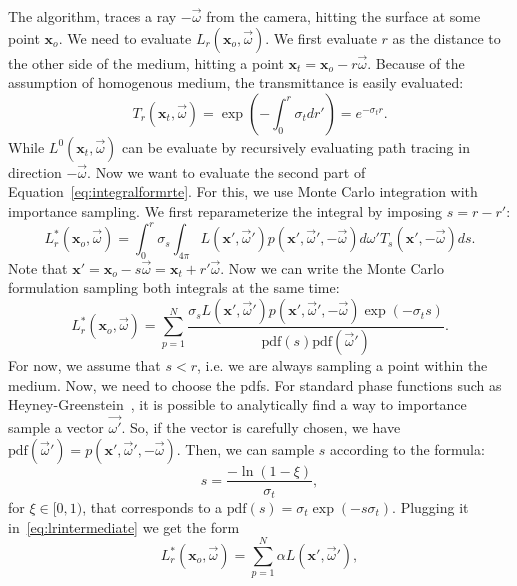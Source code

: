 The algorithm, traces a ray $-\vec{\omega}$ from the camera, hitting the surface at some point $\mathbf{x}_o$. We need to evaluate $L_r(\mathbf{x}_o, \vec{\omega})$. We first evaluate $r$ as the distance to the other side of the medium, hitting a point $\mathbf{x}_t = \mathbf{x}_o - r \vec{\omega}$. Because of the assumption of homogenous medium, the transmittance is easily evaluated:
\begin{equation*}
T_r(\mathbf{x}_t, \vec{\omega}) = \exp\left(-\int_0^r \sigma_t dr'\right) = e^{-\sigma_t r}.
\end{equation*}
While $L^0(\mathbf{x}_t, \vec{\omega})$ can be evaluate by recursively evaluating path tracing in direction $-\vec{\omega}$. Now we want to evaluate the second part of Equation~\ref{eq:integralformrte}. For this, we use Monte Carlo integration with importance sampling. We first reparameterize the integral by imposing $s = r - r'$:
\begin{equation*}
L_r^*(\mathbf{x}_o, \vec{\omega}) = \int_0^r \sigma_s \int_{4\pi} L(\mathbf{x}', \vec{\omega}') p(\mathbf{x}', \vec{\omega}', -\vec{\omega})  d\omega' T_{s}(\mathbf{x}', -\vec{\omega})  ds.
\end{equation*}
Note that $\mathbf{x}' = \mathbf{x}_o - s \vec{\omega} = \mathbf{x}_t + r' \vec{\omega}$. Now we can write the Monte Carlo formulation sampling both integrals at the same time:
\begin{equation}
\label{eq:lrintermediate}
L_r^*(\mathbf{x}_o, \vec{\omega}) = \sum_{p=1}^N \frac{\sigma_s L(\mathbf{x}', \vec{\omega}') p(\mathbf{x}', \vec{\omega}', -\vec{\omega}) \exp(-\sigma_t s)}{\text{pdf}(s) \text{pdf}(\vec{\omega}')}.
\end{equation}
For now, we assume that $s < r$, i.e. we are always sampling a point within the medium. Now, we need to choose the pdfs. For standard phase functions such as Heyney-Greenstein~\cite{Henyey1940}, it is possible to analytically find a way to importance sample a vector $\vec{\omega'}$. So, if the vector is carefully chosen, we have $\text{pdf}(\vec{\omega}') = p(\mathbf{x}', \vec{\omega}', -\vec{\omega})$. Then, we can sample $s$ according to the formula:
\begin{equation*}
s = \frac{-\ln(1 - \xi)}{\sigma_t},
\end{equation*}
for $\xi \in [0,1)$, that corresponds to a $\text{pdf}(s) = \sigma_t \exp(-s \sigma_t)$. Plugging it in~\ref{eq:lrintermediate} we get the form
\begin{equation*}
L_r^*(\mathbf{x}_o, \vec{\omega}) = \sum_{p=1}^N \alpha L(\mathbf{x}', \vec{\omega}'),
\end{equation*}
